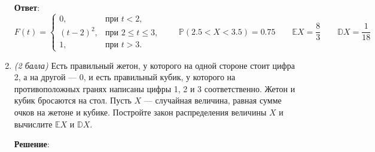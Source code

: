 \documentclass{article}
\begin{document}
\begin{enumerate}
\textbf{Ответ}:
$F(t) = \begin{cases}
    0, &\text{при } t < 2,\\
    (t-2)^2, &\text{при } 2\leq t\leq3,\\
    1, &\text{при } t > 3.
\end{cases} \qquad \mathbb{P}(2.5<X<3.5) = 0.75 \qquad \mathbb{E}X = \dfrac{8}{3} \qquad \mathbb{D}X = \dfrac{1}{18}$

\item \textit{(2 балла)} Есть правильный жетон, у которого на одной стороне стоит цифра 2, а на другой --- 0, и есть правильный кубик, у которого на противоположных гранях написаны цифры 1, 2 и 3 соответственно. Жетон и кубик бросаются на стол. Пусть $X$ --- случайная величина, равная сумме очков на жетоне и кубике. Постройте закон распределения величины $X$ и вычислите $\mathbb{E}X$ и $\mathbb{D}X$.

\textbf{Решение}:


\end{enumerate}
\end{document}

